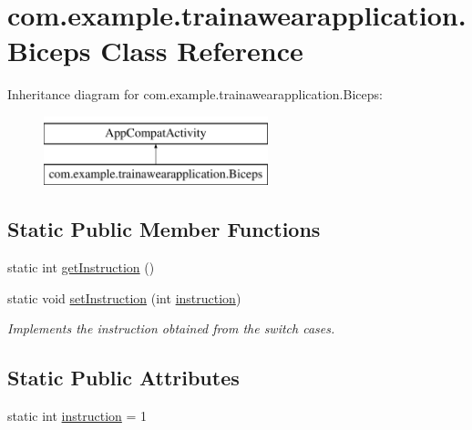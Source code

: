 \hypertarget{classcom_1_1example_1_1trainawearapplication_1_1_biceps}{}\section{com.\+example.\+trainawearapplication.\+Biceps Class Reference}
\label{classcom_1_1example_1_1trainawearapplication_1_1_biceps}
Inheritance diagram for com.\+example.\+trainawearapplication.\+Biceps\+:\begin{figure}[H]
\begin{center}
\leavevmode
\includegraphics[height=2.000000cm]{classcom_1_1example_1_1trainawearapplication_1_1_biceps}
\end{center}
\end{figure}
\subsection*{Static Public Member Functions}
\begin{DoxyCompactItemize}
\item 
static int \mbox{\hyperlink{classcom_1_1example_1_1trainawearapplication_1_1_biceps_ae96aa9493d3419ad5d9690b146926e53}{get\+Instruction}} ()
\item 
static void \mbox{\hyperlink{classcom_1_1example_1_1trainawearapplication_1_1_biceps_a05106a83eaf742a4c3e4d7c9a40d0e11}{set\+Instruction}} (int \mbox{\hyperlink{classcom_1_1example_1_1trainawearapplication_1_1_biceps_afe5d0b51d5fd89d0f25bc145c9ab0d1b}{instruction}})
\begin{DoxyCompactList}\small\item\em Implements the instruction obtained from the switch cases. \end{DoxyCompactList}\end{DoxyCompactItemize}
\subsection*{Static Public Attributes}
\begin{DoxyCompactItemize}
\item 
static int \mbox{\hyperlink{classcom_1_1example_1_1trainawearapplication_1_1_biceps_afe5d0b51d5fd89d0f25bc145c9ab0d1b}{instruction}} = 1
\end{DoxyCompactItemize}
